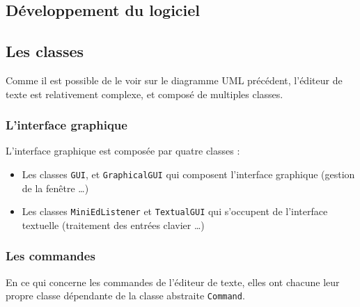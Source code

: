 \documentclass[a4paper]{article}
\begin{document}
	\newpage
	

	\begin{center}
		\section{Développement du logiciel}
	\end{center}

	\vspace{0.5cm}

		\subsection{Les classes}

		\vspace{0.5cm}

		Comme il est possible de le voir sur le diagramme UML précédent, l'éditeur de texte est relativement complexe, et composé de multiples classes. 

		\vspace{0.5cm}

			\subsubsection{L'interface graphique}

			L'interface graphique est composée par quatre classes :

			\begin{itemize}
				\item Les classes \texttt{GUI}, et \texttt{GraphicalGUI} qui composent l'interface graphique (gestion de la fenêtre \dots)

				\item Les classes \texttt{MiniEdListener} et \texttt{TextualGUI} qui s'occupent de l'interface textuelle (traitement des entrées clavier \dots)
			\end{itemize}

			\subsubsection{Les commandes}

			En ce qui concerne les commandes de l'éditeur de texte, elles ont chacune leur propre classe dépendante de la classe abstraite \texttt{Command}.
\end{document}
